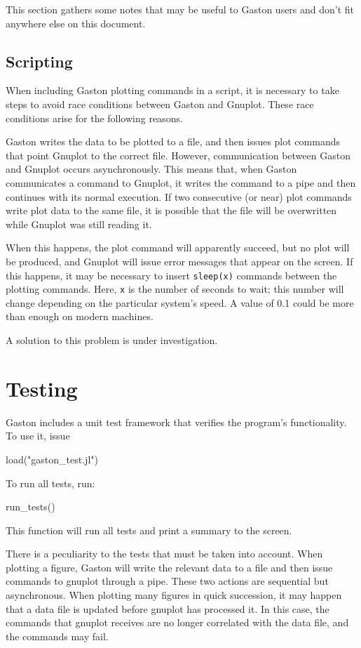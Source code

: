\documentclass[11pt]{article}
\newcommand{\cmd}[1]{\texttt{#1}}
\begin{document}
This section gathers some notes that may be useful to Gaston users and don't
fit anywhere else on this document.

\subsection{Scripting}
When including Gaston plotting commands in a script, it is necessary to take
steps to avoid race conditions between Gaston and Gnuplot. These race
conditions arise for the following reasons.

Gaston writes the data to be plotted to a file, and then issues plot commands
that point Gnuplot to the correct file. However, communication between Gaston
and Gnuplot occurs asynchronously. This means that, when Gaston communicates a
command to Gnuplot, it writes the command to a pipe and then continues with its
normal execution.  If two consecutive (or near) plot commands write plot data
to the same file, it is possible that the file will be overwritten while
Gnuplot was still reading it.

When this happens, the plot command will apparently succeed, but no plot will
be produced, and Gnuplot will issue error messages that appear on the screen.
If this happens, it may be necessary to insert \cmd{sleep(x)} commands between
the plotting commands. Here, \cmd{x} is the number of seconds to wait; this
number will change depending on the particular system's speed. A value
of 0.1 could be more than enough on modern machines.

A solution to this problem is under investigation.

\section{Testing}
\label{tests}

Gaston includes a unit test framework that verifies the program's
functionality. To use it, issue
\begin{juliacode}
load("gaston_test.jl")
\end{juliacode}
To run all tests, run:
\begin{juliacode}
run_tests()
\end{juliacode}
This function will run all tests and print a summary to the screen.

There is a peculiarity to the tests that must be taken into account. When
plotting a figure, Gaston will write the relevant data to a file and then issue
commands to gnuplot through a pipe. These two actions are sequential but
asynchronous. When plotting many figures in quick succession, it may happen
that a data file is updated before gnuplot has processed it. In this case, the
commands that gnuplot receives are no longer correlated with the data file, and
the commands may fail.
\end{document}
